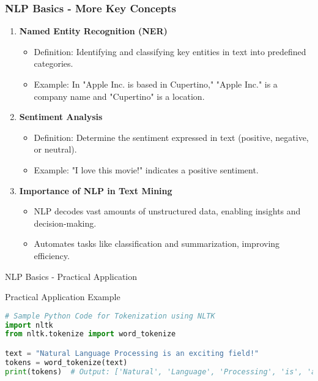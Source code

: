 \documentclass[aspectratio=169]{beamer}
\begin{document}
\begin{frame}[fragile]
    \frametitle{NLP Basics - More Key Concepts}
    \begin{enumerate}    
        \item \textbf{Named Entity Recognition (NER)}
        \begin{itemize}
            \item Definition: Identifying and classifying key entities in text into predefined categories.
            \item Example: In "Apple Inc. is based in Cupertino," "Apple Inc." is a company name and "Cupertino" is a location.
        \end{itemize}

        \item \textbf{Sentiment Analysis}
        \begin{itemize}
            \item Definition: Determine the sentiment expressed in text (positive, negative, or neutral).
            \item Example: "I love this movie!" indicates a positive sentiment.
        \end{itemize}

        \item \textbf{Importance of NLP in Text Mining}
        \begin{itemize}
            \item NLP decodes vast amounts of unstructured data, enabling insights and decision-making.
            \item Automates tasks like classification and summarization, improving efficiency.
        \end{itemize}
    \end{enumerate}
\end{frame}

\begin{frame}[fragile]{NLP Basics - Practical Application}
    \begin{block}{Practical Application Example}
        \begin{lstlisting}[language=Python]
# Sample Python Code for Tokenization using NLTK
import nltk
from nltk.tokenize import word_tokenize

text = "Natural Language Processing is an exciting field!"
tokens = word_tokenize(text)
print(tokens)  # Output: ['Natural', 'Language', 'Processing', 'is', 'an', 'exciting', 'field', '!']
        \end{lstlisting}
    \end{block}
\end{frame}
\end{document}
